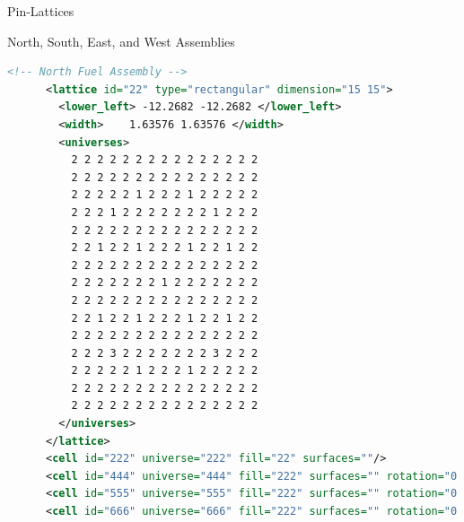 
\begin{frame}[fragile]{Pin-Lattices}

  \centering

  North, South, East, and West Assemblies

  \begin{scriptsize}
    \begin{lstlisting}[language=XML,gobble=4]
      <!-- North Fuel Assembly -->      
      <lattice id="22" type="rectangular" dimension="15 15">
        <lower_left> -12.2682 -12.2682 </lower_left>
        <width>    1.63576 1.63576 </width>
        <universes>
          2 2 2 2 2 2 2 2 2 2 2 2 2 2 2
          2 2 2 2 2 2 2 2 2 2 2 2 2 2 2
          2 2 2 2 2 1 2 2 2 1 2 2 2 2 2
          2 2 2 1 2 2 2 2 2 2 2 1 2 2 2
          2 2 2 2 2 2 2 2 2 2 2 2 2 2 2
          2 2 1 2 2 1 2 2 2 1 2 2 1 2 2
          2 2 2 2 2 2 2 2 2 2 2 2 2 2 2
          2 2 2 2 2 2 2 1 2 2 2 2 2 2 2
          2 2 2 2 2 2 2 2 2 2 2 2 2 2 2
          2 2 1 2 2 1 2 2 2 1 2 2 1 2 2
          2 2 2 2 2 2 2 2 2 2 2 2 2 2 2
          2 2 2 3 2 2 2 2 2 2 2 3 2 2 2
          2 2 2 2 2 1 2 2 2 1 2 2 2 2 2
          2 2 2 2 2 2 2 2 2 2 2 2 2 2 2
          2 2 2 2 2 2 2 2 2 2 2 2 2 2 2
        </universes>
      </lattice>
      <cell id="222" universe="222" fill="22" surfaces=""/>                     <!-- north -->
      <cell id="444" universe="444" fill="222" surfaces="" rotation="0 0 90"/>  <!-- west  -->
      <cell id="555" universe="555" fill="222" surfaces="" rotation="0 0 180"/> <!-- south -->
      <cell id="666" universe="666" fill="222" surfaces="" rotation="0 0 270"/> <!-- east  -->
    \end{lstlisting}
  \end{scriptsize}
  
\end{frame}


